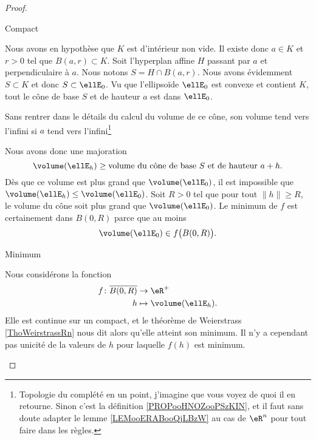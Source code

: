 \begin{proof}
\begin{subproof}
        \item[Compact]

            Nous avons en hypothèse que \( K\) est d'intérieur non vide. Il existe donc \( a\in K\) et \( r>0\) tel que \( B(a,r)\subset K\). Soit l'hyperplan affine \( H\) passant par \( a\) et perpendiculaire à \( a\). Nous notons \( S=H\cap B(a,r)\). Nous avons évidemment \( S\subset K\) et donc \( S\subset \ellE_0\). Vu que l'ellipsoïde \( \ellE_0\) est convexe et contient \( K\), tout le cône de base \( S\) et de hauteur \( a\) est dans \( \ellE_0\).

            Sans rentrer dans le détails du calcul du volume de ce cône, son volume tend vers l'infini si \( a\) tend vers l'infini\footnote{Topologie du complété en un point, j'imagine que vous voyez de quoi il en retourne. Sinon c'est la définition \ref{PROPooHNOZooPSzKIN}, et il faut sans doute adapter le lemme \ref{LEMooERABooQjLBzW} au cas de \( \eR^n\) pour tout faire dans les règles.}

            Nous avons donc une majoration
            \begin{equation}
                \volume(\ellE_h)\geq \text{volume du cône de base } S\text{ et de hauteur } a+h.
            \end{equation}
            Dès que ce volume est plus grand que \( \volume(\ellE_0)\), il est impossible que \( \volume(\ellE_h)\leq \volume(\ellE_0)\). Soit \( R>0\) tel que pour tout \( \| h \|\geq R\), le volume du cône soit plus grand que \( \volume(\ellE_0)\). Le minimum de \( f\) est certainement dans \( B(0,R)\) parce que au moins
            \begin{equation}
                \volume(\ellE_0)\in f\big( B(0,R) \big).
            \end{equation}

        \item[Minimum]

            Nous considérons la fonction
            \begin{equation}
                \begin{aligned}
                    f\colon \overline{ B(0,R) }&\to \eR^+ \\
                    h&\mapsto \volume(\ellE_h). 
                \end{aligned}
            \end{equation}
            Elle est continue sur un compact, et le théorème de Weierstrass \ref{ThoWeirstrassRn} nous dit alors qu'elle atteint son minimum. Il n'y a cependant pas unicité de la valeurs de \( h\) pour laquelle \( f(h)\) est minimum.


\end{subproof}
\end{proof}

